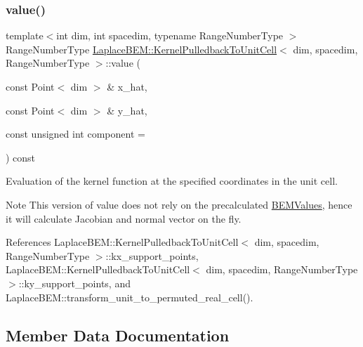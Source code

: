 \mbox{\label{classLaplaceBEM_1_1KernelPulledbackToUnitCell_ac55bd556acba999c6d71c322eff33cd9}} 
\subsubsection{\texorpdfstring{value()}{value()}}
{\footnotesize\ttfamily template$<$int dim, int spacedim, typename Range\+Number\+Type $>$ \\
Range\+Number\+Type \hyperlink{classLaplaceBEM_1_1KernelPulledbackToUnitCell}{Laplace\+B\+E\+M\+::\+Kernel\+Pulledback\+To\+Unit\+Cell}$<$ dim, spacedim, Range\+Number\+Type $>$\+::value (\begin{DoxyParamCaption}\item[{const Point$<$ dim $>$ \&}]{x\+\_\+hat,  }\item[{const Point$<$ dim $>$ \&}]{y\+\_\+hat,  }\item[{const unsigned int}]{component = {} }\end{DoxyParamCaption}) const\hspace{0.3cm}{\ttfamily [virtual]}}

Evaluation of the kernel function at the specified coordinates in the unit cell.


\begin{DoxyDescription}
\item[Note ]This version of {\ttfamily value} does not rely on the precalculated {\ttfamily \hyperlink{classLaplaceBEM_1_1BEMValues}{B\+E\+M\+Values}}, hence it will calculate Jacobian and normal vector on the fly. 
\end{DoxyDescription}

References Laplace\+B\+E\+M\+::\+Kernel\+Pulledback\+To\+Unit\+Cell$<$ dim, spacedim, Range\+Number\+Type $>$\+::kx\+\_\+support\+\_\+points, Laplace\+B\+E\+M\+::\+Kernel\+Pulledback\+To\+Unit\+Cell$<$ dim, spacedim, Range\+Number\+Type $>$\+::ky\+\_\+support\+\_\+points, and Laplace\+B\+E\+M\+::transform\+\_\+unit\+\_\+to\+\_\+permuted\+\_\+real\+\_\+cell().



\subsection{Member Data Documentation}
\mbox{\label{classLaplaceBEM_1_1KernelPulledbackToUnitCell_a03ac8378093fac9ad01272ef619aa26e}} 
